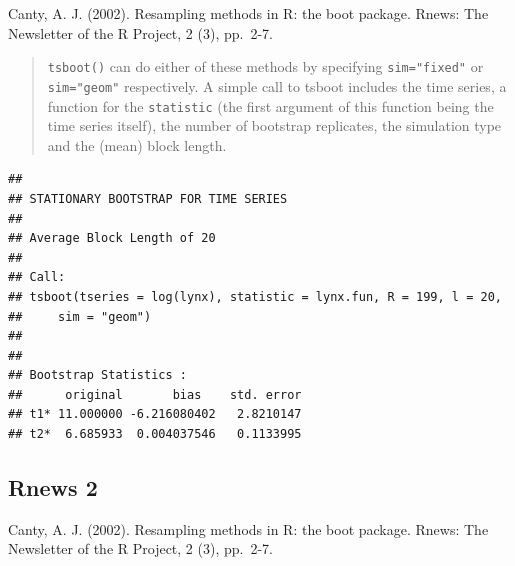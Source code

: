 \documentclass[]{book}
\newenvironment{Shaded}{\begin{snugshade}}{\end{snugshade}}
\newcommand{\KeywordTok}[1]{\textcolor[rgb]{0.13,0.29,0.53}{\textbf{#1}}}
\newcommand{\DataTypeTok}[1]{\textcolor[rgb]{0.13,0.29,0.53}{#1}}
\newcommand{\DecValTok}[1]{\textcolor[rgb]{0.00,0.00,0.81}{#1}}
\newcommand{\StringTok}[1]{\textcolor[rgb]{0.31,0.60,0.02}{#1}}
\newcommand{\CommentTok}[1]{\textcolor[rgb]{0.56,0.35,0.01}{\textit{#1}}}
\newcommand{\ControlFlowTok}[1]{\textcolor[rgb]{0.13,0.29,0.53}{\textbf{#1}}}
\newcommand{\OperatorTok}[1]{\textcolor[rgb]{0.81,0.36,0.00}{\textbf{#1}}}
\newcommand{\NormalTok}[1]{#1}
\theoremstyle{definition}
\theoremstyle{definition}
\theoremstyle{definition}
\theoremstyle{remark}
\begin{document}
Canty, A. J. (2002). Resampling methods in R: the boot package. Rnews:
The Newsletter of the R Project, 2 (3), pp.~2-7.

\begin{quote}
\texttt{tsboot()} can do either of these methods by specifying
\texttt{sim="fixed"} or \texttt{sim="geom"} respectively. A simple call
to tsboot includes the time series, a function for the
\texttt{statistic} (the first argument of this function being the time
series itself), the number of bootstrap replicates, the simulation type
and the (mean) block length.
\end{quote}

\begin{Shaded}
\end{Shaded}

\begin{verbatim}
## 
## STATIONARY BOOTSTRAP FOR TIME SERIES
## 
## Average Block Length of 20 
## 
## Call:
## tsboot(tseries = log(lynx), statistic = lynx.fun, R = 199, l = 20, 
##     sim = "geom")
## 
## 
## Bootstrap Statistics :
##      original       bias    std. error
## t1* 11.000000 -6.216080402   2.8210147
## t2*  6.685933  0.004037546   0.1133995
\end{verbatim}

\subsection{Rnews 2}\label{rnews-2}

Canty, A. J. (2002). Resampling methods in R: the boot package. Rnews:
The Newsletter of the R Project, 2 (3), pp.~2-7.
\end{document}
